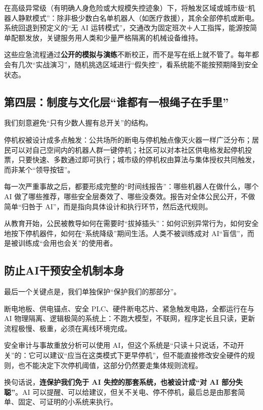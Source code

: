 在高级异常级（有明确人身危险或大规模失控迹象）下，将触发区域或城市级``机器人静默模式''：除非极少数白名单机器人（如医疗救援），其余全部停机或断电。系统回退到预定义的``无 AI 运转模式''，交通改为固定班次＋人工指挥，能源按简单配额发放，关键服务用人类和少量严格隔离的机械设备维持。

这些应急流程通过\textbf{公开的模拟与演练}不断校正，而不是写在纸上就不管了。每年都会有几次``实战演习''，随机挑选区域进行``假失控''，看系统能不能按预期降到安全状态。

\subsection{第四层：制度与文化层``谁都有一根绳子在手里''}\label{ux7b2cux56dbux5c42ux5236ux5ea6ux4e0eux6587ux5316ux5c42ux8c01ux90fdux6709ux4e00ux6839ux7ef3ux5b50ux5728ux624bux91cc}

我们刻意避免``只有少数人握有总开关''的结构。

停机权被设计成多点触发：公共场所的断电与停机触点像灭火器一样广泛分布；居民可以对自己空间内的机器人群一键停机；社区可以对本社区供电格发起停机投票，只要快速、多数通过即可执行；城市级的停机权由算法与集体授权共同触发，而非某个``领导按钮''。

每一次严重事故之后，都要形成完整的``时间线报告''：哪些机器人在做什么，哪个 AI 做了哪些推荐，哪些安全层奏效了、哪些没奏效。报告对全体公民公开，不做简单``归咎于 AI''，而是指向具体设计和执行环节，然后迭代规则。

从教育开始，公民被教导如何在需要时``拔掉插头''：如何识别异常行为，如何安全地按下停机器件，如何在``系统降级''期间生活。人类不被训练成对 AI``盲信''，而是被训练成``会用也会关''的使用者。

\subsection{防止AI干预安全机制本身}\label{ux9632ux6b62aiux5e72ux9884ux5b89ux5168ux673aux5236ux672cux8eab}

最后一个关键点是，我们单独保护``保护我们的那部分''。

断电地板、供电锚点、安全 PLC、硬件断电芯片、紧急触发电路，全都运行在与 AI 物理隔离、逻辑极简的系统上：不跑大模型，不联网，程序定长且只读，更新流程极慢、极重，必须在离线环境完成。

安全审计与事故重放分析可以使用 AI，但这个系统是``只读＋只说话，不动开关''的：它可以建议``应当在这类模式下更早停机''，但不能直接修改安全硬件的规则，也不能决定下次停机阈值，这部分仍然要走集体规则流程。

换句话说，\textbf{连保护我们免于 AI 失控的那套系统，也被设计成``对 AI 部分失聪''}。AI 可以提醒、可以给建议，但关不关电、停不停机，最后总是由那套简单、固定、可证明的小系统来执行。




